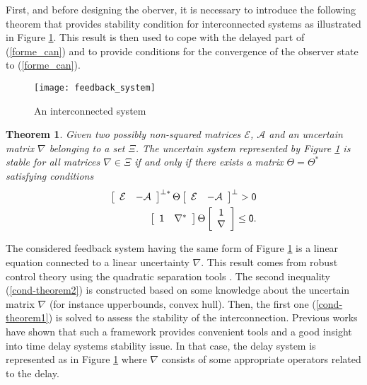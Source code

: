 \documentclass[a4paper, 10pt, onecolumn]{article}
\newtheorem{theorem}{Theorem}
\begin{document}
First, and before designing the oberver, it is necessary to introduce the following theorem \cite{Pea07} that provides stability condition for interconnected systems as illustrated in Figure \ref{feedbacksystem}. This result is then used to cope with the delayed part of (\ref{forme_can}) and to provide conditions for the convergence of the observer state to (\ref{forme_can}).
\begin{figure}
       \centerline{\texttt{[image: feedback\_system]}}
       \caption{An interconnected system}
       \label{feedbacksystem}
\end{figure}
\begin{theorem}
\label{theorem}
Given two possibly non-squared matrices $\mathcal{E}$, $\mathcal{A}$ and an uncertain matrix
 $\nabla$ belonging to a set $\Xi$. The uncertain system represented by Figure \ref{feedbacksystem} is stable for all matrices $\nabla\in\Xi$ if and only if there exists a matrix
 $\Theta=\Theta^*$ satisfying conditions
\begin{align}
\label{cond-theorem1}
\left[\begin{array}{cc}\mathcal{E}&-\mathcal{A}\end{array}\right]^{\perp*}\Theta
\left[\begin{array}{cc}\mathcal{E}&-\mathcal{A}\end{array}\right]^{\perp}>\sf{0}\\
\label{cond-theorem2}
\left[\begin{array}{cc}\sf{1}&\nabla^*\end{array}\right]\Theta
\left[\begin{array}{c}\sf{1}\\ \nabla\end{array}\right]\leq\sf{0}.
\end{align}
\end{theorem}
The considered feedback system having the same form of Figure \ref{feedbacksystem} is a linear equation connected to a linear uncertainty $\nabla$. This result comes from robust control theory using the quadratic separation tools \cite{Iwa98}. The second inequality (\ref{cond-theorem2}) is constructed based on some knowledge about the uncertain matrix $\nabla$ (for instance upperbounds, convex hull). Then, the first one (\ref{cond-theorem1}) is solved to assess the stability of the interconnection. Previous works \cite{Gou06a} have shown that such a framework provides convenient tools and a good insight into time delay systems stability issue. In that case, the delay system is represented as in Figure \ref{feedbacksystem} where $\nabla$ consists of some appropriate operators related to the delay.\\
\end{document}
